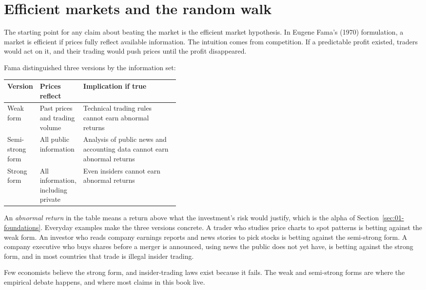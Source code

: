 \section{Efficient markets and the random walk}
\label{sec:01-efficient-markets}

The starting point for any claim about beating the market is the efficient market hypothesis. In Eugene Fama's (1970) formulation, a market is efficient if prices fully reflect available information. The intuition comes from competition. If a predictable profit existed, traders would act on it, and their trading would push prices until the profit disappeared.

Fama distinguished three versions by the information set:

\begin{center}
\small
\begin{tabularx}{0.9\linewidth}{@{}>{\raggedright\arraybackslash}p{0.180\linewidth}>{\raggedright\arraybackslash}p{0.234\linewidth}>{\raggedright\arraybackslash}X@{}}
\toprule
Version & Prices reflect & Implication if true \\
\midrule
Weak form & Past prices and trading volume & Technical trading rules cannot earn abnormal returns \\
Semi-strong form & All public information & Analysis of public news and accounting data cannot earn abnormal returns \\
Strong form & All information, including private & Even insiders cannot earn abnormal returns \\
\bottomrule
\end{tabularx}
\end{center}

An \emph{abnormal return} in the table means a return above what the investment's risk would justify, which is the alpha of Section~\ref{sec:01-foundations}. Everyday examples make the three versions concrete. A trader who studies price charts to spot patterns is betting against the weak form. An investor who reads company earnings reports and news stories to pick stocks is betting against the semi-strong form. A company executive who buys shares before a merger is announced, using news the public does not yet have, is betting against the strong form, and in most countries that trade is illegal insider trading.

Few economists believe the strong form, and insider-trading laws exist because it fails. The weak and semi-strong forms are where the empirical debate happens, and where most claims in this book live.

